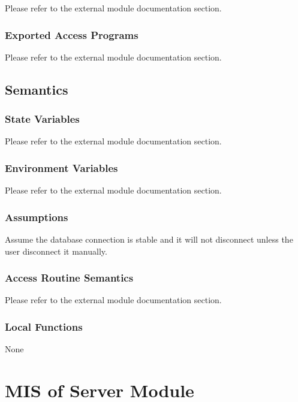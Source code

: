 \documentclass[12pt, titlepage]{article}
\begin{document}
Please refer to the external module documentation section.

\subsubsection{Exported Access Programs}

Please refer to the external module documentation section.

\subsection{Semantics}

\subsubsection{State Variables}

Please refer to the external module documentation section.

\subsubsection{Environment Variables}

Please refer to the external module documentation section.

\subsubsection{Assumptions}

Assume the database connection is stable and it will not disconnect unless the user disconnect it manually.

\subsubsection{Access Routine Semantics}

Please refer to the external module documentation section.

\subsubsection{Local Functions}

None

\newpage

\section{MIS of Server Module} \label{mServer}
\end{document}
